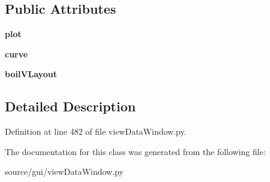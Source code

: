 \subsection*{Public Attributes}
\begin{DoxyCompactItemize}
\item 
\mbox{\label{classview_data_window_1_1_boil_tab_a8961705b02e666873b9f81391eb23d55}} 
{\bfseries plot}
\item 
\mbox{\label{classview_data_window_1_1_boil_tab_affd42d646a65429c185d7409ca515115}} 
{\bfseries curve}
\item 
\mbox{\label{classview_data_window_1_1_boil_tab_a41221954e205f2102027be1d39b6a7ed}} 
{\bfseries boil\+V\+Layout}
\end{DoxyCompactItemize}


\subsection{Detailed Description}


Definition at line 482 of file view\+Data\+Window.\+py.



The documentation for this class was generated from the following file\+:\begin{DoxyCompactItemize}
\item 
source/gui/view\+Data\+Window.\+py\end{DoxyCompactItemize}
